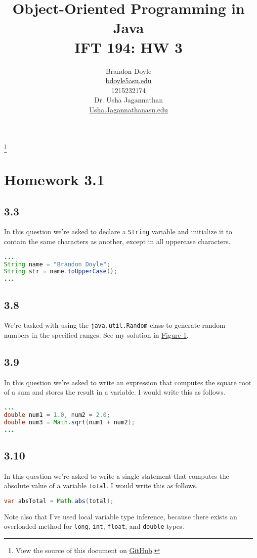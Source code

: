 \documentclass[leqno, 11pt]{article}
\title{\vspace{6ex}Object-Oriented Programming in Java\\
  \Large IFT 194: HW 3}
\author{Brandon Doyle\\
\href{mailto:bdoyle@asu.edu}{bdoyle5\at{}asu.edu}\\
1215232174\\[1em]
Dr. Usha Jagannathan\\
\href{mailto:Usha.Jagannathan@asu.edu}{Usha.Jagannathan\at{}asu.edu}}
\newcommand\blfootnote[1]{%
  \begingroup
    \renewcommand\thefootnote{}\footnote{#1}
    \addtocounter{footnote}{-1}
  \endgroup
}
\newcommand{\iftcodefigure}[3]{%
  \begin{codefigure}
    \label{#1}
    \addtocounter{figure}{-1}
    
  \end{codefigure}
}
\begin{document}
\begin{titlepage}
\clearpage\maketitle
\thispagestyle{empty}
\end{titlepage}
\tableofcontents
\newpage
\blfootnote{View the source of this document on \href{https://github.com/bjd2385/IFT_194_labs/blob/master/\jobname.tex}{GitHub}.}
\section{Homework 3.1}
\subsection{3.3}
In this question we're asked to declare a \texttt{String} variable and initialize it to contain the same characters as another, except in all uppercase characters.
\begin{lstlisting}[language=java, xleftmargin=0.37\textwidth]
...
String name = "Brandon Doyle";
String str = name.toUpperCase();
...
\end{lstlisting}
\subsection{3.8}
We're tasked with using the \texttt{java.util.Random} class to generate random numbers in the specified ranges. See my solution in \hyperref[fig:one]{Figure 1}.
\iftcodefigure{fig:one}{Rand.java}{%
  /home/brandon/eclipse-workspace/ift_194_hw/src/hw_3/Rand.java}
\subsection{3.9}
In this question we're asked to write an expression that computes the square root of a sum and stores the result in a variable. I would write this as follows.
\begin{lstlisting}[language=java, xleftmargin=0.33\textwidth]
...
double num1 = 1.0, num2 = 2.0;
double num3 = Math.sqrt(num1 + num2);
...
\end{lstlisting}
\subsection{3.10}
In this question we're asked to write a single statement that computes the absolute value of a variable \texttt{total}. I would write this as follows.
\begin{lstlisting}[language=java, xleftmargin=0.35\textwidth]
var absTotal = Math.abs(total);
\end{lstlisting}
Note also that I've used local variable type inference, because there exists an overloaded method for \texttt{long}, \texttt{int}, \texttt{float}, and \texttt{double} types.
\end{document}
